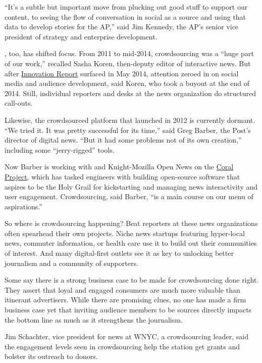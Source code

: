\begin{itemize}
``It’s a subtle but important move from plucking out good stuff to support our content, to seeing the flow of conversation in social as a source and using that data to develop stories for the AP,'' said Jim Kennedy, the AP’s senior vice president of strategy and enterprise development.\autocite{Kennedy}

, too, has shifted focus. From 2011 to mid-2014, crowdsourcing was a “huge part of our work,” recalled Sasha Koren, then-deputy editor of interactive news. But after  \href{http://mashable.com/2014/05/16/full-new-york-times-innovation-report/#fLsAGSD30Oq4}{Innovation Report}\autocite{Innovation} surfaced in May 2014, attention zeroed in on social media and audience development, said Koren, who took a buyout at the end of 2014. Still, individual reporters and desks at the news organization do structured call-outs.

Likewise, the crowdsourced platform that  launched in 2012 is currently dormant. ``We tried it. It was pretty successful for its time,'' said Greg Barber, the Post’s director of digital news. ``But it had some problems not of its own creation,'' including some ``jerry-rigged'' tools.\autocite{Barber}
 
Now Barber is working with  and Knight-Mozilla Open News on the \href{https://coralproject.net/}{Coral Project},\autocite{Coral} which has tasked engineers with building open-source software that aspires to be the Holy Grail for kickstarting and managing news interactivity and user engagement. Crowdsourcing, said Barber, ``is a main course on our menu of aspirations.'' 

So where is crowdsourcing happening? Beat reporters at these news organizations often spearhead their own projects. Niche news startups featuring hyper-local news, commuter information, or health care use it to build out their communities of interest. And many digital-first outlets see it as key to unlocking better journalism and a community of supporters. 

Some say there is a strong business case to be made for crowdsourcing done right. They assert that loyal and engaged consumers are much more valuable than itinerant advertisers. While there are promising clues, no one has made a firm business case yet that inviting audience members to be sources directly impacts the bottom line as much as it strengthens the journalism.

Jim Schachter, vice president for news at WNYC, a crowdsourcing leader, said the engagement levels seen in crowdsourcing help the station get grants and bolster its outreach to donors.\autocite{Schachter}


\end{itemize}
